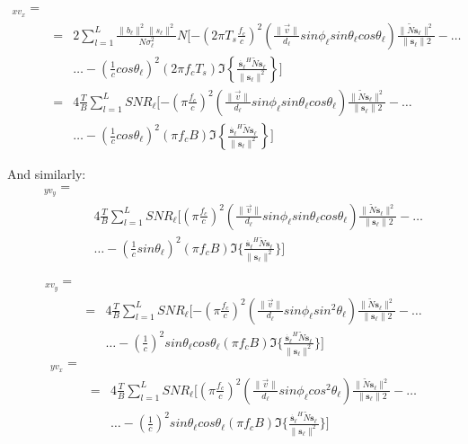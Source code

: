 \begin{eqnarray}
[J]_{x v_x} = \\
&=& 2\sum_{l=1}^L\frac{\|b_\ell \|^2\|s_\ell \|^2}{N\sigma_\ell ^2}N[ -\left(2 \pi T_s \frac{f_c}{c}\right)^2\left(\frac{\|\vec{v}\|}{d_\ell } sin \phi_\ell  sin \theta_\ell  cos \theta_\ell \right)\frac{\|\tilde{N}\mathbf{s_\ell }\|^2}{\|\mathbf{s_\ell }\|2} -\dots \nonumber\\
&&\dots -\left(\frac{1}{c}cos \theta_\ell \right)^2(2 \pi f_c T_s) \Im \left\{\frac{\mathbf{\dot{s_\ell }}^H\tilde{N}\mathbf{s_\ell }}{\|\mathbf{s_\ell }\|^2} \right\}]
 \nonumber \\
 &=& 4\frac{T}{B} \sum_{l=1}^L{SNR}_\ell  [ -\left( \pi \frac{f_c}{c}\right)^2\left(\frac{\|\vec{v}\|}{d_\ell } sin \phi_\ell  sin \theta_\ell  cos \theta_\ell \right)\frac{\|\tilde{N}\mathbf{s_\ell }\|^2}{\|\mathbf{s_\ell }\|2} -\dots \nonumber\\
&&\dots -\left(\frac{1}{c}cos \theta_\ell \right)^2( \pi f_c B) \Im \left\{\frac{\mathbf{\dot{s_\ell }}^H\tilde{N}\mathbf{s_\ell }}{\|\mathbf{s_\ell }\|^2} \right\}]
 \nonumber
\end{eqnarray}

And similarly:
\begin{eqnarray}
[J]_{y v_y} = \\
&&4\frac{T}{B} \sum_{l=1}^L{SNR}_\ell  [ \left( \pi \frac{f_c}{c}\right)^2\left(\frac{\|\vec{v}\|}{d_\ell } sin \phi_\ell  sin \theta_\ell  cos \theta_\ell \right)\frac{\|\tilde{N}\mathbf{s_\ell }\|^2}{\|\mathbf{s_\ell }\|2} -\dots \nonumber\\
&&\dots -\left(\frac{1}{c}sin \theta_\ell \right)^2( \pi f_c B) \Im \{\frac{\mathbf{\dot{s_\ell }}^H\tilde{N}\mathbf{s_\ell }}{\|\mathbf{s_\ell }\|^2}\} ]
 \nonumber
\end{eqnarray}

\begin{eqnarray}
[J]_{x v_y} = \\
&=& 4\frac{T}{B} \sum_{l=1}^L{SNR}_\ell  [ -\left( \pi \frac{f_c}{c}\right)^2\left(\frac{\|\vec{v}\|}{d_\ell } sin \phi_\ell  sin^2 \theta_\ell \right)\frac{\|\tilde{N}\mathbf{s_\ell }\|^2}{\|\mathbf{s_\ell }\|2} -\dots \nonumber\\
&&\dots -\left(\frac{1}{c}\right)^2 sin \theta_\ell  cos \theta_\ell ( \pi f_c B) \Im \{ \frac{\mathbf{\dot{s_\ell }}^H\tilde{N}\mathbf{s_\ell }}{\|\mathbf{s_\ell }\|^2} \}]
 \nonumber
\end{eqnarray}
\begin{eqnarray}
[J]_{y v_x} = \\
&=& 4\frac{T}{B} \sum_{l=1}^L{SNR}_\ell  [ \left( \pi \frac{f_c}{c}\right)^2\left(\frac{\|\vec{v}\|}{d_\ell } sin \phi_\ell  cos^2 \theta_\ell \right)\frac{\|\tilde{N}\mathbf{s_\ell }\|^2}{\|\mathbf{s_\ell }\|2} -\dots \nonumber\\
&&\dots -\left(\frac{1}{c}\right)^2 sin \theta_\ell  cos \theta_\ell ( \pi f_c B) \Im \{ \frac{\mathbf{\dot{s_\ell }}^H\tilde{N}\mathbf{s_\ell }}{\|\mathbf{s_\ell }\|^2}\} ]
 \nonumber
\end{eqnarray}

